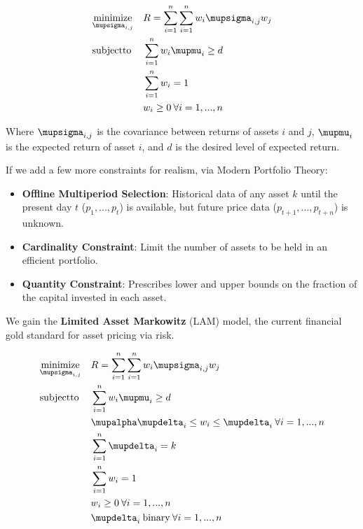 \documentclass[11pt, a4paper]{awesome-cv}
\begin{document}
\begin{cvletter}
\begin{equation*}
\begin{aligned}
& \underset{\mupsigma_{i,j}}{\mathrm{minimize}}
& & R = \sum_{i=1}^{n} \sum_{i=1}^{n} w_{i} \mupsigma_{i,j} w_{j} \\
& \mathrm{subject to}
& & \sum_{i=1}^{n} w_{i}\mupmu_{i} \geq d \\
&&& \sum_{i=1}^{n} w_{i}  = 1 \\
&&& w_{i} \geq 0 \: \forall i = 1,...,n \\
\end{aligned}
\end{equation*}

Where \(\mupsigma_{i,j}\) is the covariance between returns of assets \(i\) and \(j\),
\(\mupmu_{i}\) is the expected return of asset \(i\), and \(d\) is the desired level of
expected return.

If we add a few more constraints for realism, via Modern Portfolio Theory:
\begin{itemize}
\item \textbf{Offline Multiperiod Selection}: Historical data of any asset \(k\) until the
present day \(t\) (\(p_1 , . . . , p_t\)) is available, but future price data
(\(p_{t+1}, . . ., p_{t+n}\)) is unknown.
\item \textbf{Cardinality Constraint}: Limit the number of assets to be held in an efficient portfolio.
\item \textbf{Quantity Constraint}: Prescribes lower and upper bounds on the fraction of the capital invested in each asset.
\end{itemize}

We gain the \textbf{\textbf{Limited Asset Markowitz}} (LAM) model, the current
financial gold standard for asset pricing via risk.

\begin{equation*}
\begin{aligned}
& \underset{\mupsigma_{i,j}}{\text{minimize}}
& & R = \sum_{i=1}^{n} \sum_{i=1}^{n} w_{i} \mupsigma_{i,j} w_{j} \\
& \mathrm{subject to}
& & \sum_{i=1}^{n} w_{i}\mupmu_{i} \geq d \\
&&& \mupalpha\mupdelta_{i} \leq w_{i} \leq \mupdelta_{i} \: \forall i = 1,...,n \\
&&& \sum_{i=1}^{n} \mupdelta_{i}  = k \\
&&& \sum_{i=1}^{n} w_{i}  = 1 \\
&&& w_{i} \geq 0 \: \forall i = 1,...,n \\
&&& \mupdelta_{i}   \: \text{binary} \: \forall i = 1,...,n \\
\end{aligned}
\end{equation*}


\end{cvletter}
\end{document}
